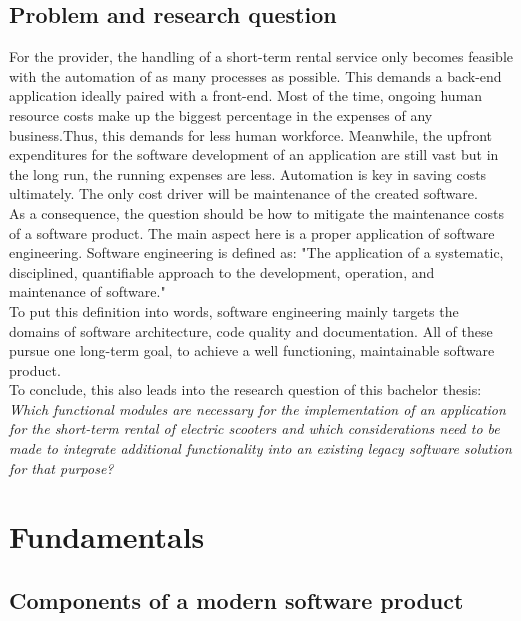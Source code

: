 \documentclass[12pt,a4paper]{report}
\begin{document}
\section{Problem and research question}

For the provider, the handling of a short-term rental service
only becomes feasible with the automation of as many processes as possible.
This demands a back-end application ideally paired with a front-end.
Most of the time, ongoing human resource costs make up the biggest percentage
in the expenses of any business.\cn Thus, this demands for less human workforce.
Meanwhile, the upfront expenditures for the software development of
an application are still vast but in the long run, the running expenses are less.
Automation is key in saving costs ultimately. The only cost driver will be maintenance
of the created software.\\
As a consequence, the question should be how to mitigate the maintenance costs
of a software product. The main aspect here is a proper application of software engineering.
Software engineering is defined as: "The application of a systematic, disciplined,
quantifiable approach to the development, operation, and maintenance of software."~\cite{se-ieee}\\
To put this definition into words, software engineering mainly targets
the domains of software architecture, code quality and documentation.
All of these pursue one long-term goal, to achieve a well functioning, maintainable
software product.\\
To conclude, this also leads into the research question of this bachelor thesis:\\
\emph{Which functional modules are necessary for the implementation of an application
for the short-term rental of electric scooters and which considerations need to be made
to integrate additional functionality into an existing legacy software solution for that purpose?}



\chapter{Fundamentals} \label{chap:fundamentals}


\section{Components of a modern software product}
\end{document}
